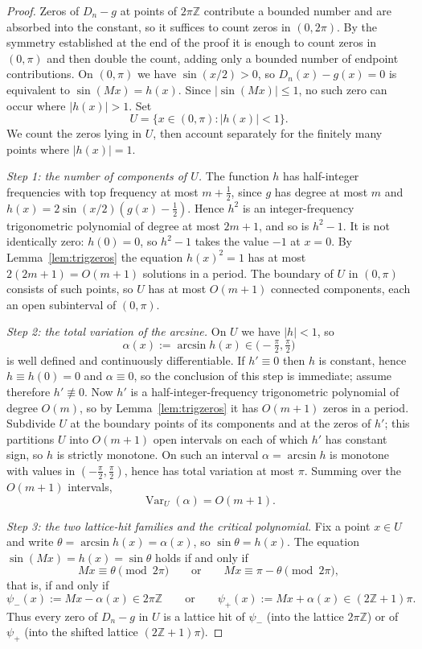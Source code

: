 \documentclass[11pt,reqno]{amsart}
\theoremstyle{plain}
\theoremstyle{definition}
\theoremstyle{remark}
\begin{document}
\begin{proof}
Zeros of $D_n-g$ at points of $2\pi\mathbb Z$ contribute a bounded number and are absorbed into the constant, so it suffices to count zeros in $(0,2\pi)$. By the symmetry established at the end of the proof it is enough to count zeros in $(0,\pi)$ and then double the count, adding only a bounded number of endpoint contributions. On $(0,\pi)$ we have $\sin(x/2)>0$, so $D_n(x)-g(x)=0$ is equivalent to $\sin(Mx)=h(x)$. Since $|\sin(Mx)|\le1$, no such zero can occur where $|h(x)|>1$. Set
\[
  U=\{x\in(0,\pi):|h(x)|<1\}.
\]
We count the zeros lying in $U$, then account separately for the finitely many points where $|h(x)|=1$.

\medskip
\emph{Step 1: the number of components of $U$.}
The function $h$ has half-integer frequencies with top frequency at most $m+\tfrac12$, since $g$ has degree at most $m$ and $h(x)=2\sin(x/2)(g(x)-\tfrac12)$. Hence $h^2$ is an integer-frequency trigonometric polynomial of degree at most $2m+1$, and so is $h^2-1$. It is not identically zero: $h(0)=0$, so $h^2-1$ takes the value $-1$ at $x=0$. By Lemma~\ref{lem:trigzeros} the equation $h(x)^2=1$ has at most $2(2m+1)=O(m+1)$ solutions in a period. The boundary of $U$ in $(0,\pi)$ consists of such points, so $U$ has at most $O(m+1)$ connected components, each an open subinterval of $(0,\pi)$.

\medskip
\emph{Step 2: the total variation of the arcsine.}
On $U$ we have $|h|<1$, so
\[
  \alpha(x):=\arcsin h(x)\in\bigl(-\tfrac\pi2,\tfrac\pi2\bigr)
\]
is well defined and continuously differentiable. If $h'\equiv0$ then $h$ is constant, hence $h\equiv h(0)=0$ and $\alpha\equiv0$, so the conclusion of this step is immediate; assume therefore $h'\not\equiv0$. Now $h'$ is a half-integer-frequency trigonometric polynomial of degree $O(m)$, so by Lemma~\ref{lem:trigzeros} it has $O(m+1)$ zeros in a period. Subdivide $U$ at the boundary points of its components and at the zeros of $h'$; this partitions $U$ into $O(m+1)$ open intervals on each of which $h'$ has constant sign, so $h$ is strictly monotone. On such an interval $\alpha=\arcsin h$ is monotone with values in $(-\tfrac\pi2,\tfrac\pi2)$, hence has total variation at most $\pi$. Summing over the $O(m+1)$ intervals,
\[
  \operatorname{Var}_U(\alpha)=O(m+1).
\]

\medskip
\emph{Step 3: the two lattice-hit families and the critical polynomial.}
Fix a point $x\in U$ and write $\theta=\arcsin h(x)=\alpha(x)$, so $\sin\theta=h(x)$. The equation $\sin(Mx)=h(x)=\sin\theta$ holds if and only if
\[
  Mx\equiv\theta \pmod{2\pi}\qquad\text{or}\qquad Mx\equiv\pi-\theta\pmod{2\pi},
\]
that is, if and only if
\[
  \psi_-(x):=Mx-\alpha(x)\in 2\pi\mathbb Z
  \qquad\text{or}\qquad
  \psi_+(x):=Mx+\alpha(x)\in(2\mathbb Z+1)\pi.
\]
Thus every zero of $D_n-g$ in $U$ is a lattice hit of $\psi_-$ (into the lattice $2\pi\mathbb Z$) or of $\psi_+$ (into the shifted lattice $(2\mathbb Z+1)\pi$).


\end{proof}
\end{document}
